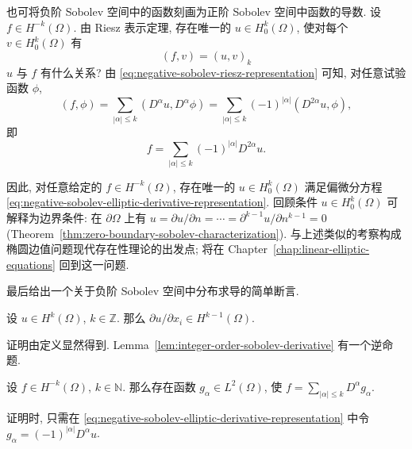 也可将负阶 Sobolev 空间中的函数刻画为正阶 Sobolev 空间中函数的导数. 设 $f\in H^{-k}(\Omega)$. 由 Riesz 表示定理, 存在唯一的 $u\in H_0^k(\Omega)$, 使对每个 $v\in H_0^k(\Omega)$ 有
\begin{equation}\label{eq:negative-sobolev-riesz-representation}
(f,v)=(u,v)_k
\end{equation}
$u$ 与 $f$ 有什么关系? 由 \eqref{eq:negative-sobolev-riesz-representation} 可知, 对任意试验函数 $\phi$,
\begin{equation}\label{eq:negative-sobolev-riesz-derivative-pairings}
(f,\phi)=\sum_{|\alpha|\leq k}(D^\alpha u,D^\alpha\phi)=\sum_{|\alpha|\leq k}(-1)^{|\alpha|}(D^{2\alpha}u,\phi),
\end{equation}
即
\begin{equation}\label{eq:negative-sobolev-elliptic-derivative-representation}
f=\sum_{|\alpha|\leq k}(-1)^{|\alpha|}D^{2\alpha}u.
\end{equation}


因此, 对任意给定的 $f\in H^{-k}(\Omega)$, 存在唯一的 $u\in H_0^k(\Omega)$ 满足偏微分方程 \eqref{eq:negative-sobolev-elliptic-derivative-representation}. 回顾条件 $u\in H_0^k(\Omega)$ 可解释为边界条件: 在 $\partial\Omega$ 上有 $u=\partial u/\partial n=\cdots=\partial^{k-1}u/\partial n^{k-1}=0$ (Theorem~\ref{thm:zero-boundary-sobolev-characterization}). 与上述类似的考察构成椭圆边值问题现代存在性理论的出发点; 将在 Chapter~\ref{chap:linear-elliptic-equations} 回到这一问题.

最后给出一个关于负阶 Sobolev 空间中分布求导的简单断言.

\begin{Lemma}
\label{lem:integer-order-sobolev-derivative}
设 $u\in H^k(\Omega)$, $k\in\mathbb{Z}$. 那么 $\partial u/\partial x_i\in H^{k-1}(\Omega)$.
\end{Lemma}

证明由定义显然得到. Lemma~\ref{lem:integer-order-sobolev-derivative} 有一个逆命题.

\begin{Lemma}
\label{lem:negative-sobolev-l-two-derivative-representation}
设 $f\in H^{-k}(\Omega)$, $k\in\mathbb{N}$. 那么存在函数 $g_\alpha\in L^2(\Omega)$, 使 $f=\sum_{|\alpha|\leq k}D^\alpha g_\alpha$.
\end{Lemma}

证明时, 只需在 \eqref{eq:negative-sobolev-elliptic-derivative-representation} 中令 $g_\alpha=(-1)^{|\alpha|}D^\alpha u$.
